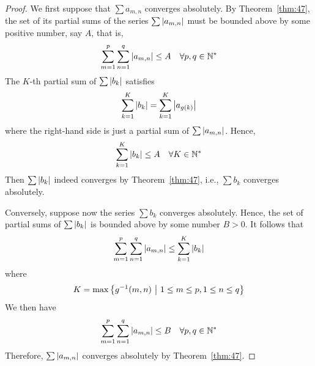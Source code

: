\documentclass[thmcnt=section, 12pt]{my-elegantbook}
\begin{document}
\begin{proof}
    We first suppose that $\sum a_{m,n}$ converges absolutely. By Theorem~\ref{thm:47}, the set of its partial sums of the series $\sum \left\lvert a_{m,n} \right\rvert$ must be bounded above by some positive number, say $A$, that is,
    \begin{align*}
        \sum_{m=1}^p \sum_{n=1}^q \left\lvert a_{m,n} \right\rvert \leq A
        \quad \forall p,q \in \mathbb{N}^\ast
    \end{align*}
    The $K$-th partial sum of $\sum \left\lvert b_k \right\rvert$ satisfies
    \begin{align*}
        \sum_{k=1}^K \left\lvert b_k \right\rvert
        = \sum_{k=1}^K \left\lvert a_{g(k)} \right\rvert
    \end{align*}
    where the right-hand side is just a partial sum of $\sum \left\lvert a_{m,n} \right\rvert$. Hence, 
    \begin{align*}
        \sum_{k=1}^K \left\lvert b_k \right\rvert
        \leq A 
        \quad
        \forall K \in \mathbb{N}^\ast
    \end{align*}
    Then $\sum \left\lvert b_k \right\rvert$ indeed converges by Theorem~\ref{thm:47}, i.e., $\sum b_k$ converges absolutely.

    Conversely, suppose now the series $\sum b_k$ converges absolutely. Hence, the set of partial sums of $\sum \left\lvert b_k \right\rvert$ is bounded above by some number $B > 0$. It follows that 
    \begin{align*}
        \sum_{m=1}^p \sum_{n=1}^q \left\lvert a_{m,n} \right\rvert
        \leq \sum_{k=1}^K \left\lvert b_k \right\rvert
    \end{align*}
    where
    \begin{align*}
        K = \max \left\{  g^{-1}(m,n)  \ \middle| \ 1 \leq m \leq p, 1 \leq n \leq q \right\}
    \end{align*}
    We then have
    \begin{align*}
        \sum_{m=1}^p \sum_{n=1}^q \left\lvert a_{m,n} \right\rvert
        \leq B
        \quad
        \forall p,q \in \mathbb{N}^\ast
    \end{align*}
    Therefore, $\sum \left\lvert a_{m,n} \right\rvert$ converges absolutely by Theorem~\ref{thm:47}.
\end{proof}
\end{document}
